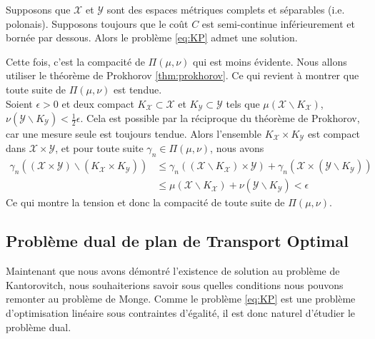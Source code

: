 \documentclass[a4paper,12pt]{article}
\begin{document}
\begin{proposition}
Supposons que $\mathcal{X}$ et $\mathcal{Y}$ sont des espaces métriques complets et séparables (i.e. polonais). Supposons toujours que le coût $C$ est semi-continue inférieurement et bornée par dessous. Alors le problème \eqref{eq:KP} admet une solution. 
\end{proposition}
\begin{preuve}
Cette fois, c'est la compacité de $\Pi(\mu,\nu)$ qui est moins évidente. Nous allons utiliser le théorème de Prokhorov \eqref{thm:prokhorov}. Ce qui revient à montrer que toute suite de $\Pi (\mu,\nu)$ est tendue. \\
Soient $\epsilon >0$ et deux compact $K_{\mathcal{X}}\subset\mathcal{X}$ et $K_{\mathcal{Y}}\subset \mathcal{Y}$ tels que $\mu (\mathcal{X}\backslash K_{\mathcal{X}})$, $\nu (\mathcal{Y} \backslash K_{\mathcal{Y}}) < \frac{1}{2}\epsilon$. Cela est possible par la réciproque du théorème de Prokhorov, car une mesure seule est toujours tendue. 
Alors l'ensemble $K_{\mathcal{X}}\times K_{\mathcal{Y}}$ est compact dans $\mathcal{X}\times\mathcal{Y}$, et pour toute suite $\gamma_n\in\Pi (\mu,\nu )$, nous avons 
\begin{align*}
\gamma_n\left((\mathcal{X}\times\mathcal{Y})\backslash (K_{\mathcal{X}}\times K_{\mathcal{Y}}) \right) &\leq \gamma_n((\mathcal{X}\backslash K_{\mathcal{X}})\times \mathcal{Y}) + \gamma_n(\mathcal{X}\times (\mathcal{Y}\backslash K_{\mathcal{Y}}))\\
&\leq \mu (\mathcal{X} \backslash K_{\mathcal{X}}) + \nu (\mathcal{Y}\backslash K_{\mathcal{Y}}) < \epsilon
\end{align*}
Ce qui montre la tension et donc la compacité de toute suite de $\Pi (\mu,\nu )$. 
\end{preuve}

\subsection{Problème dual de plan de Transport Optimal}
Maintenant que nous avons démontré l'existence de solution au problème de Kantorovitch, nous souhaiterions savoir sous quelles conditions nous pouvons remonter au problème de Monge. Comme le problème \eqref{eq:KP} est une problème d'optimisation linéaire sous contraintes d'égalité, il est donc naturel d'étudier le problème dual. \\
\end{document}
